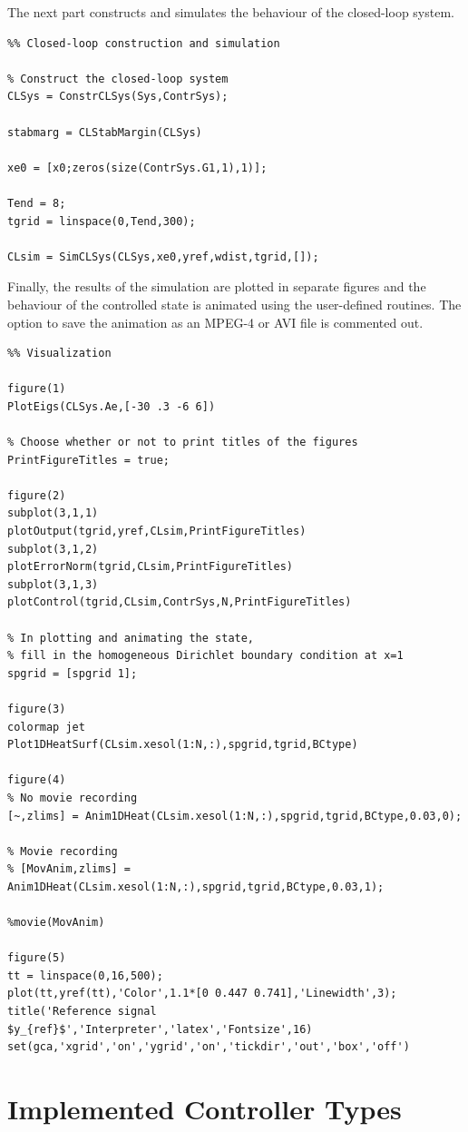 \documentclass[11pt, a4paper]{amsart}
\theoremstyle{definition}
\numberwithin{equation}{section}
\begin{document}
The next part constructs and simulates the behaviour of the closed-loop system.

\begin{lstlisting}
%% Closed-loop construction and simulation

% Construct the closed-loop system
CLSys = ConstrCLSys(Sys,ContrSys);

stabmarg = CLStabMargin(CLSys)

xe0 = [x0;zeros(size(ContrSys.G1,1),1)];

Tend = 8;
tgrid = linspace(0,Tend,300);

CLsim = SimCLSys(CLSys,xe0,yref,wdist,tgrid,[]);
\end{lstlisting}

Finally, the results of the simulation are plotted in separate figures and the behaviour of the controlled state is animated using the user-defined routines. The option to save the animation as an MPEG-4 or AVI file is commented out.

\begin{lstlisting}
%% Visualization

figure(1)
PlotEigs(CLSys.Ae,[-30 .3 -6 6])

% Choose whether or not to print titles of the figures
PrintFigureTitles = true;

figure(2)
subplot(3,1,1)
plotOutput(tgrid,yref,CLsim,PrintFigureTitles)
subplot(3,1,2)
plotErrorNorm(tgrid,CLsim,PrintFigureTitles)
subplot(3,1,3)
plotControl(tgrid,CLsim,ContrSys,N,PrintFigureTitles)

% In plotting and animating the state,
% fill in the homogeneous Dirichlet boundary condition at x=1
spgrid = [spgrid 1];

figure(3)
colormap jet
Plot1DHeatSurf(CLsim.xesol(1:N,:),spgrid,tgrid,BCtype)

figure(4)
% No movie recording
[~,zlims] = Anim1DHeat(CLsim.xesol(1:N,:),spgrid,tgrid,BCtype,0.03,0);

% Movie recording
% [MovAnim,zlims] = Anim1DHeat(CLsim.xesol(1:N,:),spgrid,tgrid,BCtype,0.03,1);

%movie(MovAnim)

figure(5)
tt = linspace(0,16,500);
plot(tt,yref(tt),'Color',1.1*[0 0.447 0.741],'Linewidth',3);
title('Reference signal $y_{ref}$','Interpreter','latex','Fontsize',16)
set(gca,'xgrid','on','ygrid','on','tickdir','out','box','off')
\end{lstlisting}


\section{Implemented Controller Types}
\label{sec:ControllerTypes}
\end{document}
